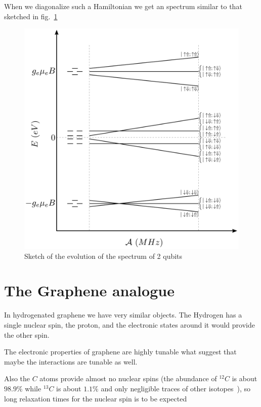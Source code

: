 When we diagonalize such a Hamiltonian we get an spectrum similar to that sketched in fig.~\ref{levels2Qbits}
\begin{figure}[h!]
\centering
  \includegraphics{chapter03/figures/levels2Qbits.pdf}
\vspace{-5pt}
\caption{Sketch of the evolution of the spectrum of 2 qubits}
\label{levels2Qbits}
\end{figure}
\FloatBarrier


\section{The Graphene analogue}
In hydrogenated graphene we have very similar objects. The Hydrogen has a single nuclear spin, the proton, and the electronic states around it would provide the other spin.

The electronic properties of graphene are highly tunable what suggest that maybe the interactions are tunable as well.

Also the $C$ atoms provide almost no nuclear spins (the abundance of $^{12}C$ is about $98.9\%$ while $^{13}C$ is about $1.1\%$ and only negligible traces of other isotopes~\cite{iupac}), so long relaxation times for the nuclear spin is to be expected


